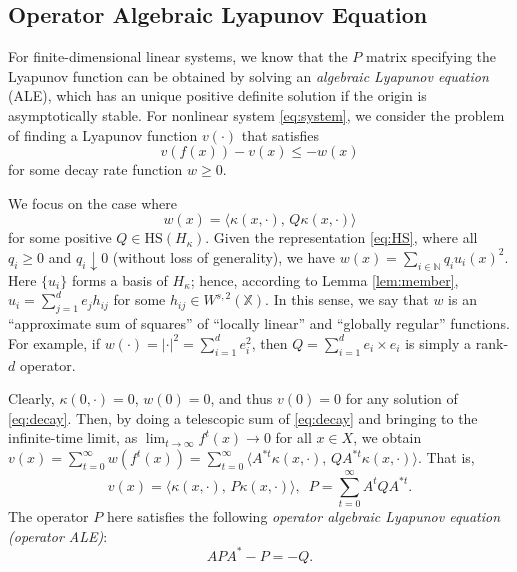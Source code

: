 \documentclass[english]{cccconf}
\renewcommand{\emph}[1]{\textit{#1}}
\newcommand{\mr}[1]{\mathrm{#1}}
\newcommand{\mbb}[1]{\mathds{#1}} %
\newcommand{\mN}{\mbb{N}}
\newcommand{\mX}{\mbb{X}}
\newcommand{\bra}[1]{\left( #1 \right)}
\newcommand{\ip}[2]{\langle #1, \, #2 \rangle}
\begin{document}
\subsection{Operator Algebraic Lyapunov Equation} 
For finite-dimensional linear systems, we know that the $P$ matrix specifying the Lyapunov function can be obtained by solving an \emph{algebraic Lyapunov equation} (ALE), which has an unique positive definite solution if the origin is asymptotically stable. 
For nonlinear system \eqref{eq:system}, we consider the problem of finding a Lyapunov function $v(\cdot)$ that satisfies 
\begin{equation}\label{eq:decay}
    v(f(x)) - v(x) \leq -w(x)
\end{equation}
for some decay rate function $w\geq 0$. 

\par We focus on the case where $$w(x) = \ip{\kappa(x, \cdot)}{Q\kappa(x, \cdot)}$$ for some positive $Q\in \mr{HS}(H_\kappa)$. Given the representation \eqref{eq:HS}, where all $q_i\geq0$ and $q_i\downarrow 0$ (without loss of generality), we have $w(x) = \sum_{i\in \mN}q_iu_i(x)^2$. 
Here $\{u_i\}$ forms a basis of $H_\kappa$; hence, according to Lemma \ref{lem:member}, $u_i = \sum_{j=1}^d e_jh_{ij}$ for some $h_{ij}\in W^{s,2}(\mX)$. In this sense, we say that $w$ is an ``approximate sum of squares'' of ``locally linear'' and ``globally regular'' functions. 
For example, if $w(\cdot) = |\cdot|^2 = \sum_{i=1}^d e_i^2$, then $Q = \sum_{i=1}^d e_i\times e_i$ is simply a rank-$d$ operator. 

\par Clearly, $\kappa(0, \cdot) = 0$, $w(0)=0$, and thus $v(0)=0$ for any solution of \eqref{eq:decay}. Then, by doing a telescopic sum of \eqref{eq:decay} and bringing to the infinite-time limit, as $\lim_{t\rightarrow\infty} f^t(x)\rightarrow 0$ for all $x\in X$, we obtain
$v(x) = \sum_{t=0}^\infty w\bra{f^t(x)} = \sum_{t=0}^\infty \ip{A^{*t}\kappa(x, \cdot)}{QA^{\ast t}\kappa(x, \cdot)}. $
That is, 
\begin{equation}\label{eq:P.series}
    \textstyle 
    v(x) = \ip{\kappa(x, \cdot)}{P\kappa(x, \cdot)}, \enspace 
    P = \sum_{t=0}^\infty A^t Q A^{*t}.
\end{equation}
The operator $P$ here satisfies the following \emph{operator algebraic Lyapunov equation (operator ALE)}:
\begin{equation}\label{eq:P.ale}
    APA^\ast - P = -Q. 
\end{equation}
\end{document}
